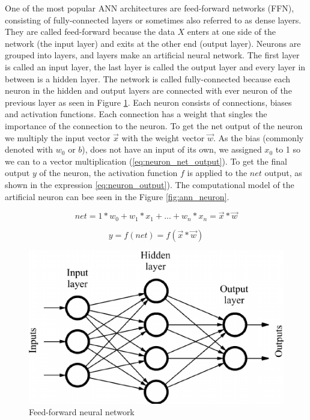 \documentclass[times, utf8, diplomski]{fer}
\begin{document}
One of the most popular ANN architectures are feed-forward networks (FFN), consisting of fully-connected layers or sometimes also referred to as dense layers. They are called feed-forward because the data $X$ enters at one side of the network (the input layer) and exits at the other end (output layer). Neurons are grouped into layers, and layers make an artificial neural network. The first layer is called an input layer, the last layer is called the output layer and every layer in between is a hidden layer. The network is called fully-connected because each neuron in the hidden and output layers are connected with ever neuron of the previous layer as seen in Figure \ref{fig:ann}.
Each neuron consists of connections, biases and activation functions. Each connection has a weight that singles the importance of the connection to the neuron. To get the net output of the neuron we multiply the input vector $\vec{x}$ with the weight vector $\vec{w}$. As the bias (commonly denoted with $w_0$ or $b$), does not have an input of its own, we assigned $x_0$ to 1 so we can to a vector multiplication (\ref{eq:neuron_net_output}). To get the final output $y$ of the neuron, the activation function $f$ is applied to the $net$ output, as shown in the expression \ref{eq:neuron_output}). The computational model of the artificial neuron can bee seen in the Figure \ref{fig:ann_neuron}.

\begin{equation}
	\label{eq:neuron_net_output}
	net = 1*w_0 + w_1*x_1 + ... + w_n*x_n = \vec{x} * \vec{w}
\end{equation}

\begin{equation}
	\label{eq:neuron_output}
	y = f(net) = f(\vec{x}*\vec{w})
\end{equation}

\begin{figure}
  \includegraphics[width=\linewidth]{figures/ann.png}
  \caption{Feed-forward neural network}
  \label{fig:ann}
\end{figure}
\end{document}
